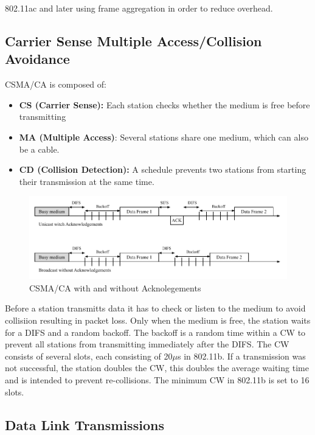 802.11ac and later using frame aggregation in order to reduce overhead.

\subsection{Carrier Sense Multiple Access/Collision Avoidance}

\ac{CSMA/CA} is composed of:
\begin{itemize}
	\setlength\itemsep{-0.0em}
	\item \textbf{CS (Carrier Sense):} Each station checks whether the medium is free before transmitting
	\item \textbf{MA (Multiple Access)}: Several stations share one medium, which can also be a cable.
	\item \textbf{CD (Collision Detection):} A schedule prevents two stations from starting their transmission at the same time.
\end{itemize}

\begin{figure}[h]
	\centering
	\includegraphics[scale=0.75]{figures/CSMA_CD.pdf}
	\caption{CSMA/CA with and without Acknolegements}
	\label{fig:CSMACD}
\end{figure}

Before a station transmitts data it has to check or listen to the medium to avoid collisiion resulting in packet loss.
Only when the medium is free, the station waits for a \ac{DIFS} and a random backoff.
The backoff is a random time within a \ac{CW} to prevent all stations from transmitting immediately after the \ac{DIFS}.
The \ac{CW} consists of several slots, each consisting of 20$\mu$s in 802.11b.
If a transmission was not successful, the station doubles the \ac{CW}, 
this doubles the average waiting time and is intended to prevent re-collisions.
The minimum \ac{CW} in 802.11b is set to 16 slots.

\subsection{Data Link Transmissions}

